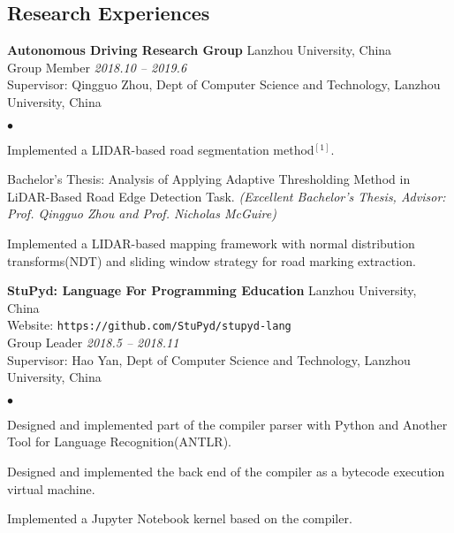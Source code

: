 \documentclass[margin,line,pifont,palatino,courier]{res}
\newenvironment{list1}{
	\begin{list}{\ding{113}}{%
			\setlength{\itemsep}{0in}
			\setlength{\parsep}{0in} \setlength{\parskip}{0in}
			\setlength{\topsep}{0in} \setlength{\partopsep}{0in}
			\setlength{\leftmargin}{0.17in}}}{\end{list}}
\newenvironment{list2}{
	\begin{list}{$\bullet$}{%
			\setlength{\itemsep}{0in}
			\setlength{\parsep}{0in} \setlength{\parskip}{0in}
			\setlength{\topsep}{0in} \setlength{\partopsep}{0in}
			\setlength{\leftmargin}{0.2in}}}{\end{list}}
\begin{document}
\begin{resume}
%		
			
		\section{\sc Research Experiences}
		
		{\bf Autonomous Driving Research Group} \hfill Lanzhou University, China \\
		Group Member \hfill {\sl 2018.10 -- 2019.6} \\
		Supervisor: Qingguo Zhou, Dept of Computer Science and Technology, Lanzhou University, China
		\begin{list2}
			\item Implemented a LIDAR-based road segmentation method$^{[1]}$.
			\item Bachelor's Thesis: Analysis of Applying Adaptive Thresholding Method in LiDAR-Based Road Edge Detection Task. {\sl (Excellent Bachelor's Thesis, Advisor: Prof. Qingguo Zhou and Prof. Nicholas McGuire)}
			\item Implemented a LIDAR-based mapping framework with normal distribution transforms(NDT) and sliding window strategy for road marking extraction.
		\end{list2}
	
		{\bf StuPyd: Language For Programming Education} \hfill Lanzhou University, China \\
		Website: \verb+https://github.com/StuPyd/stupyd-lang+ \\
		Group Leader \hfill {\sl 2018.5 -- 2018.11} \\
		Supervisor: Hao Yan, Dept of Computer Science and Technology, Lanzhou University, China 
		\begin{list2}
			\item Designed and implemented part of the compiler parser with Python and Another Tool for Language Recognition(ANTLR).
			\item Designed and implemented the back end of the compiler as a bytecode execution virtual machine.
			\item Implemented a Jupyter Notebook kernel based on the compiler. 
		\end{list2}	
		

\end{resume}
\end{document}
